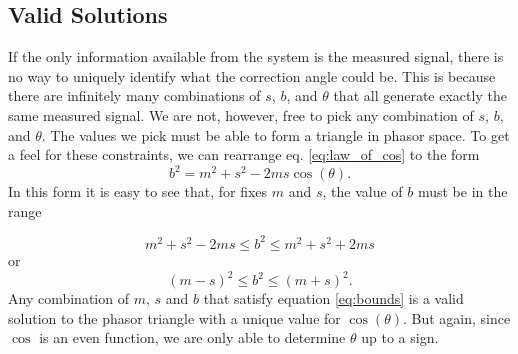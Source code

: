 \documentclass[paper=a4, fontsize=11pt]{scrartcl}
\numberwithin{equation}{section}		%
\numberwithin{figure}{section}			%
\numberwithin{table}{section}				%
\begin{document}
\begin{appendices}
\subsection{Valid Solutions} \label{section:validity}
If the only information available from the system is the measured signal, there is no way to uniquely identify what the correction angle could be.  This is because there are infinitely many combinations of $s$, $b$, and $\theta$ that all generate exactly the same measured signal. We are not, however, free to pick any combination of $s$, $b$, and $\theta$.  The values we pick must be able to form a triangle in phasor space.  To get a feel for these constraints, we can rearrange eq. \ref{eq:law_of_cos} to the form
\begin{equation}
    b^2 = m^2 + s^2 - 2 m s \cos\left(\theta\right).
\end{equation}
In this form it is easy to see that, for fixes $m$ and $s$, the value of $b$ must be in the range

\begin{equation*}
      m^2 + s^2 - 2 m s \leq b ^ 2 \leq  m^2 + s^2 + 2 m s
\end{equation*}
or
\begin{equation} \label{eq:bounds}
      \left(m-s\right)^2 \leq b ^ 2 \leq \left(m + s\right)^2.  
\end{equation}
Any combination of $m$, $s$ and $b$ that satisfy equation \ref{eq:bounds} is a valid solution to the phasor triangle with a unique value for $\cos\left(\theta\right)$.  But again, since $\cos$ is an even function, we are only able to determine $\theta$ up to a sign.
    

\end{appendices}
\end{document}
